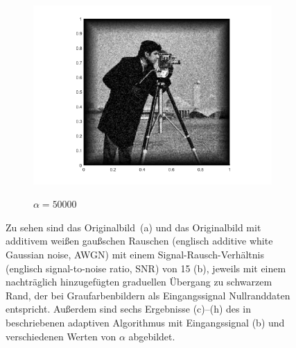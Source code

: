 \begin{figure}[!ht]
\begin{subfigure}{.32\linewidth}
    \caption{$\alpha=50000$}
    \includegraphics[trim = 100 30 80 20, clip, width=\linewidth]
      {pictures/chapIntroduction/denoiseSNR15/alpha50000/solutionGrayscale.png}
    \label{fig:snr15alpha50000}
  \end{subfigure}
  
  \vspace{-1mm}

  \caption{Zu sehen sind das Originalbild\protect\footnotemark\ (a) und das
    Originalbild mit additivem weißen gaußschen Rauschen (englisch \glqq
    additive white Gaussian noise\grqq{}, AWGN) mit einem
    Signal-Rausch-Verhältnis (englisch \glqq signal-to-noise ratio\grqq{}, SNR)
    von 15 (b), jeweils mit einem nachträglich hinzugefügten graduellen
    Übergang zu schwarzem Rand, der bei Graufarbenbildern als Eingangssignal
    Nullranddaten entspricht.  Außerdem sind sechs Ergebnisse (c)--(h) des in
     beschriebenen adaptiven Algorithmus mit
    Eingangssignal (b) und verschiedenen Werten von $\alpha$ abgebildet.}
  \label{fig:exampleDenoising}
\end{figure}

\vspace{-1mm}

